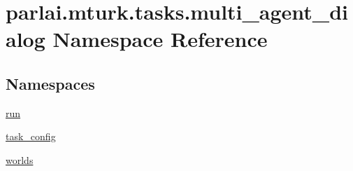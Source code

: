 \hypertarget{namespaceparlai_1_1mturk_1_1tasks_1_1multi__agent__dialog}{}\section{parlai.\+mturk.\+tasks.\+multi\+\_\+agent\+\_\+dialog Namespace Reference}
\label{namespaceparlai_1_1mturk_1_1tasks_1_1multi__agent__dialog}
\subsection*{Namespaces}
\begin{DoxyCompactItemize}
\item 
 \hyperlink{namespaceparlai_1_1mturk_1_1tasks_1_1multi__agent__dialog_1_1run}{run}
\item 
 \hyperlink{namespaceparlai_1_1mturk_1_1tasks_1_1multi__agent__dialog_1_1task__config}{task\+\_\+config}
\item 
 \hyperlink{namespaceparlai_1_1mturk_1_1tasks_1_1multi__agent__dialog_1_1worlds}{worlds}
\end{DoxyCompactItemize}
